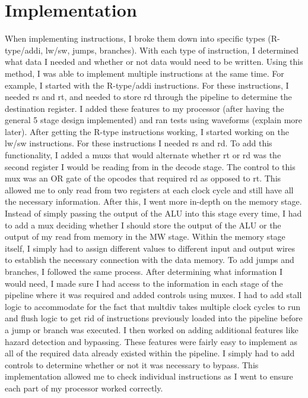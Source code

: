 \documentclass[letterpaper]{article} %
\begin{document}
\section*{Implementation}
When implementing instructions, I broke them down into specific types (R-type/addi, lw/sw, jumps, branches). With each type of instruction, I determined what data I needed and whether or not data would need to be written. Using this method, I was able to implement multiple instructions at the same time. For example, I started with the R-type/addi instructions. For these instructions, I needed rs and rt, and needed to store rd through the pipeline to determine the destination register. I added these features to my processor (after having the general 5 stage design implemented) and ran tests using waveforms (explain more later). After getting the R-type instructions working, I started working on the lw/sw instructions. For these instructions I needed rs and rd. To add this functionality, I added a muxs that would alternate whether rt or rd was the second register I would be reading from in the decode stage. The control to this mux was an OR gate of the opcodes that required rd as opposed to rt. This allowed me to only read from two registers at each clock cycle and still have all the necessary information. After this, I went more in-depth on the memory stage. Instead of simply passing the output of the ALU into this stage every time, I had to add a mux deciding whether I should store the output of the ALU or the output of my read from memory in the MW stage. Within the memory stage itself, I simply had to assign different values to different input and output wires to establish the necessary connection with the data memory. To add jumps and branches, I followed the same process. After determining what information I would need, I made sure I had access to the information in each stage of the pipeline where it was required and added controls using muxes. I had to add stall logic to accommodate for the fact that multdiv takes multiple clock cycles to run and flush logic to get rid of instructions previously loaded into the pipeline before a jump or branch was executed. I then worked on adding additional features like hazard detection and bypassing. These features were fairly easy to implement as all of the required data already existed within the pipeline. I simply had to add controls to determine whether or not it was necessary to bypass. This implementation allowed me to check individual instructions as I went to ensure each part of my processor worked correctly. 
\end{document}
